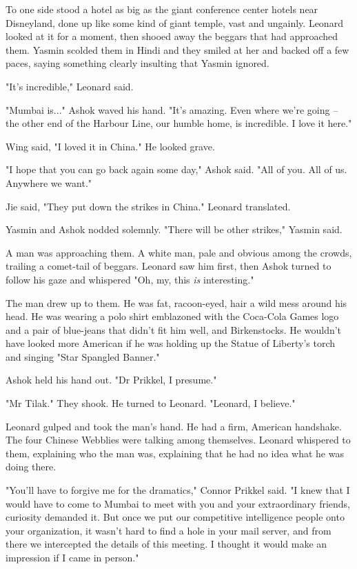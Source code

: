 To one side stood a hotel as big as the giant conference center
hotels near Disneyland, done up like some kind of giant temple,
vast and ungainly. Leonard looked at it for a moment, then shooed
away the beggars that had approached them. Yasmin scolded them in
Hindi and they smiled at her and backed off a few paces, saying
something clearly insulting that Yasmin ignored.

"It's incredible," Leonard said.

"Mumbai is..." Ashok waved his hand. "It's amazing. Even where
we're going -- the other end of the Harbour Line, our humble home,
is incredible. I love it here."

Wing said, "I loved it in China." He looked grave.

"I hope that you can go back again some day," Ashok said. "All of
you. All of us. Anywhere we want."

Jie said, "They put down the strikes in China." Leonard
translated.

Yasmin and Ashok nodded solemnly. "There will be other strikes,"
Yasmin said.

A man was approaching them. A white man, pale and obvious among the
crowds, trailing a comet-tail of beggars. Leonard saw him first,
then Ashok turned to follow his gaze and whispered "Oh, my, this
\emph{is} interesting."

The man drew up to them. He was fat, racoon-eyed, hair a wild mess
around his head. He was wearing a polo shirt emblazoned with the
Coca-Cola Games logo and a pair of blue-jeans that didn't fit him
well, and Birkenstocks. He wouldn't have looked more American if he
was holding up the Statue of Liberty's torch and singing "Star
Spangled Banner."

Ashok held his hand out. "Dr Prikkel, I presume."

"Mr Tilak." They shook. He turned to Leonard. "Leonard, I
believe."

Leonard gulped and took the man's hand. He had a firm, American
handshake. The four Chinese Webblies were talking among themselves.
Leonard whispered to them, explaining who the man was, explaining
that he had no idea what he was doing there.

"You'll have to forgive me for the dramatics," Connor Prikkel said.
"I knew that I would have to come to Mumbai to meet with you and
your extraordinary friends, curiosity demanded it. But once we put
our competitive intelligence people onto your organization, it
wasn't hard to find a hole in your mail server, and from there we
intercepted the details of this meeting. I thought it would make an
impression if I came in person."

